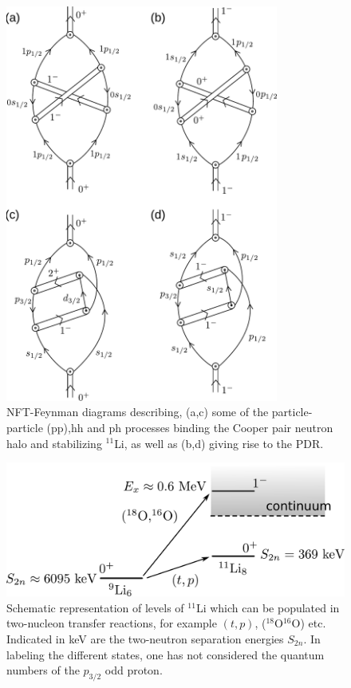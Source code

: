\begin{subappendices}
\begin{figure}
\includegraphics[width=0.8\textwidth]{C8/figsC8/Nobel40Years-4b.pdf}
\caption{NFT-Feynman diagrams describing, (a,c) some of the particle-particle (pp),hh and ph processes binding the Cooper pair neutron halo 
and stabilizing $^{11}$Li, as well as  (b,d) giving rise to the PDR.}\label{fig6.I.2}
\end{figure}

\begin{figure}
\includegraphics[width=\textwidth]{C8/figsC8/figa3_newnew.pdf}
\caption{Schematic representation of levels of $^{11}$Li which can be populated  in two-nucleon transfer reactions, for example $(t,p)$, ($^{18}$O$^{16}$O) etc. Indicated in keV are the two-neutron
separation energies $S_{2n}$. In labeling the different states, one has not considered the quantum numbers of the $p_{3/2}$ odd proton. }\label{fig6.I.3} 
\end{figure}


\end{subappendices}

